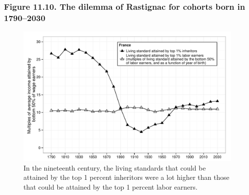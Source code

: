 \documentclass[t]{beamer}\usepackage[]{graphicx}\usepackage[]{color}
\newenvironment{knitrout}{}{} %
\begin{document}
\begin{frame}[label=Figure_11_10]
\frametitle{Figure 11.10. The dilemma of Rastignac for cohorts born in 1790--2030}
\begin{figure}[t]
\begin{minipage}[b]{\textwidth}
\centering
\begin{knitrout}\footnotesize
{}\color{fgcolor}

{\centering \includegraphics[width=1\linewidth]{figures/bw/Figure_11_10} 

}



\end{knitrout}
\caption{In the nineteenth century, the living standards that could be attained by the top 1 percent inheritors were a lot higher than those that could be attained by the top 1 percent labor earners.}
\end{minipage}
\end{figure}
\end{frame}
\end{document}
